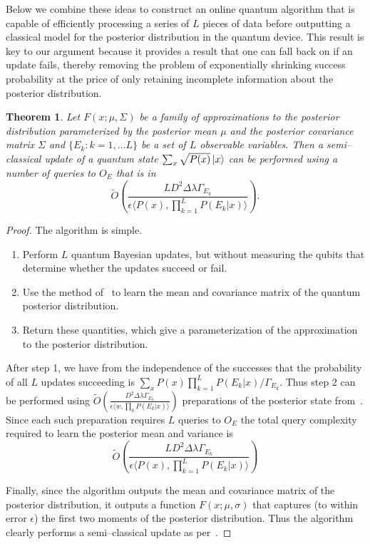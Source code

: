 \documentclass[aps,amsmath,onecolumn,amssymb,notitlepage]{revtex4-1}
\newtheorem{theorem}{Theorem}
\begin{document}
Below we combine these ideas to construct an online quantum algorithm that is capable of efficiently processing a series of $L$ pieces of data before outputting a classical model for the posterior distribution in the quantum device.  This result is key to our argument because it provides a result that one can fall back on if an update fails, thereby removing the problem of exponentially shrinking success probability at the price of only retaining incomplete information about the posterior distribution.

\begin{theorem}
Let $F(x;\mu, \Sigma)$ be a family of approximations to the posterior distribution parameterized by the posterior mean $\mu$ and the posterior covariance matrix $\Sigma$ and $\{E_k: k=1,\ldots L\}$ be a set of $L$ observable variables.  Then a semi--classical update of a quantum state $\sum_x \sqrt{P(x)} \left|x\right\rangle$ can be performed using a number of queries to $O_E$ that is in
$$
\tilde{O} \left(\frac{LD^2 \Delta  \lambda\Gamma_{E_k}}{\epsilon \langle  P(x), \prod_{k=1}^LP(E_k|x)\rangle} \right).
$$
\end{theorem}
\begin{proof}
The algorithm is simple.  
\begin{enumerate}
\item Perform $L$ quantum Bayesian updates, but without measuring the qubits that determine whether the updates succeed or fail.
\item Use the method of~ to learn the mean and covariance matrix of the quantum posterior distribution.
\item Return these quantities, which give a parameterization of the approximation to the posterior distribution.
\end{enumerate}

After step 1, we have from the independence of the successes that the probability of all $L$ updates succeeding is $\sum_x P(x) \prod_{k=1}^L P(E_k|x)/\Gamma_{E_k}$.  Thus step 2 can be performed using $\tilde{O}\left(\frac{D^2\Delta \lambda \Gamma_{E_k}}{\epsilon \langle w, \prod_k P(E_k|x)\rangle}\right)$ preparations of the posterior state from~.  Since each such preparation requires $L$ queries to $O_E$ the total query complexity required to learn the posterior mean and variance is
\begin{equation}
\tilde{O} \left(\frac{LD^2 \Delta \lambda\Gamma_{E_k} }{\epsilon \langle  P(x), \prod_{k=1}^LP(E_k|x)\rangle} \right)
\end{equation}

Finally, since the algorithm outputs the mean and covariance matrix of the posterior distribution, it outputs a function $F(x;\mu,\sigma)$ that captures (to within error $\epsilon$) the first two moments of the posterior distribution.  Thus the algorithm clearly performs a semi--classical update as per~.
\end{proof}
\end{document}
